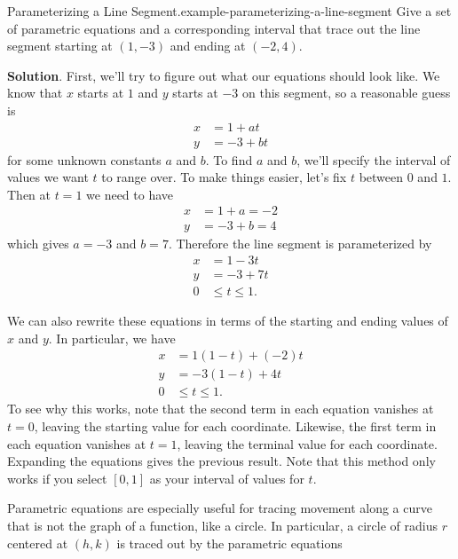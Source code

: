 \documentclass[10pt,]{book}
\numberwithin{equation}{section}
\newcommand{\amp}{&}
\begin{document}
\begin{example}{Parameterizing a Line Segment.}{example-parameterizing-a-line-segment}%
\hypertarget{p-996}{}%
Give a set of parametric equations and a corresponding interval that trace out the line segment starting at \((1,-3)\) and ending at \((-2,4)\).%
\par\smallskip%
\noindent\textbf{Solution}.\hypertarget{solution-200}{}\quad%
\hypertarget{p-997}{}%
First, we'll try to figure out what our equations should look like. We know that \(x\) starts at \(1\) and \(y\) starts at \(-3\) on this segment, so a reasonable guess is%
\begin{align*}
x \amp = 1 + at \\
y \amp = -3 + bt 
\end{align*}
for some unknown constants \(a\) and \(b\). To find \(a\) and \(b\), we'll specify the interval of values we want \(t\) to range over. To make things easier, let's fix \(t\) between \(0\) and \(1\). Then at \(t = 1\) we need to have%
\begin{align*}
x \amp = 1 + a = -2 \\
y \amp = -3 + b = 4 
\end{align*}
which gives \(a = -3\) and \(b = 7\). Therefore the line segment is parameterized by%
\begin{align*}
x \amp = 1 - 3t \\
y \amp = -3 + 7t \\
0 \amp \leq t\leq 1 \text{.}
\end{align*}
%
\par
\hypertarget{p-998}{}%
We can also rewrite these equations in terms of the starting and ending values of \(x\) and \(y\). In particular, we have%
\begin{align*}
x \amp = 1(1 - t) + (-2)t \\
y \amp = -3(1 - t) + 4t \\
0 \amp \leq t\leq 1 \text{.}
\end{align*}
To see why this works, note that the second term in each equation vanishes at \(t = 0\), leaving the starting value for each coordinate. Likewise, the first term in each equation vanishes at \(t = 1\), leaving the terminal value for each coordinate. Expanding the equations gives the previous result. Note that this method only works if you select \([0,1]\) as your interval of values for \(t\).%
\end{example}
\hypertarget{p-999}{}%
Parametric equations are especially useful for tracing movement along a curve that is not the graph of a function, like a circle. In particular, a circle of radius \(r\) centered at \((h,k)\) is traced out by the parametric equations%
\end{document}
